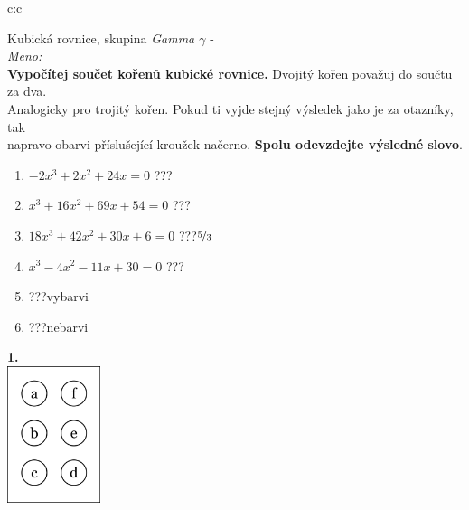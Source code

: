 \documentclass[10pt]{report}
\begin{document}
\begin{tabular}{c:c}
\begin{minipage}[c][99mm][t]{0.49\linewidth}
\begin{center}
\vspace{7mm}
{\huge Kubická rovnice, skupina \textit{Gamma $\gamma$} -}\\[4.5mm]
\textit{Meno:}\phantom{xxxxxxxxxxxxxxxxxxxxxxxxxxxxxxxxxxxxxxxxxxxxxxxxxxxxxxxxxxxxxxxxx}\\[3.5mm]
\textbf{Vypočítej součet kořenů kubické rovnice.} Dvojitý kořen považuj do součtu za dva.\\Analogicky pro trojitý kořen. Pokud ti vyjde stejný výsledek jako je za otazníky, tak\\napravo obarvi příslušející kroužek načerno. \textbf{Spolu odevzdejte výsledné slovo}.\\[3mm]
\begin{minipage}{0.77\linewidth}
\begin{center}
\begin{varwidth}{\textwidth}
\begin{enumerate}
\large
\item $-2x^3+2x^2+24x=0$\quad \dotfill\; ???\;\dotfill {}
\item $x^3+16x^2+69x+54=0$\quad \dotfill\; ???\;\dotfill {}
\item $18x^3+42x^2+30x+6=0$\quad \dotfill\; ???\;\dotfill \quad $\nicefrac{5}{3}$
\item $x^3-4x^2-11x+30=0$\quad \dotfill\; ???\;\dotfill {}
\item \quad \dotfill\; ???\;\dotfill \quad vybarvi
\item \quad \dotfill\; ???\;\dotfill \quad nebarvi
\end{enumerate}
\end{varwidth}
\end{center}
\end{minipage}
\begin{minipage}{0.20\linewidth}
\begin{center}
{\Huge\bfseries 1.} \\[2mm]
\includegraphics[height=40mm]{../images/braille.png}

\end{center}
\end{minipage}
\end{center}
\end{minipage}
\end{tabular}
\end{document}
